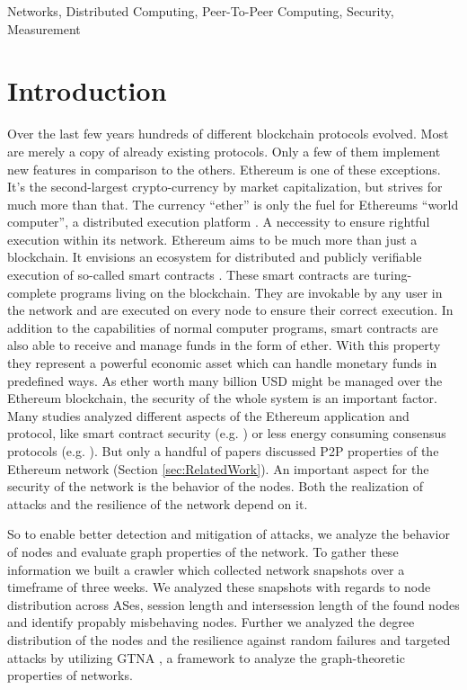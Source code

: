 \documentclass[10pt,conference,final]{IEEEtran}
\begin{document}
\begin{IEEEkeywords}
Networks, Distributed Computing, Peer-To-Peer Computing, Security, Measurement
\end{IEEEkeywords}

\maketitle


\section{Introduction}
Over the last few years hundreds of different blockchain protocols evolved.
Most are merely a copy of already existing protocols.
Only a few of them implement new features in comparison to the others.
Ethereum \cite{1,2} is one of these exceptions.
It's the second-largest crypto-currency by market capitalization, but strives for much more than that.
The currency ``ether'' is only the fuel for Ethereums ``world computer'', a distributed execution platform \cite{3,4}.
A neccessity to ensure rightful execution within its network.
Ethereum aims to be much more than just a blockchain.
It envisions an ecosystem for distributed and publicly verifiable execution of so-called smart contracts \cite{5}.
These smart contracts are turing-complete programs living on the blockchain.
They are invokable by any user in the network and are executed on every node to ensure their correct execution.
In addition to the capabilities of normal computer programs, smart contracts are also able to receive and manage funds in the form of ether.
With this property they represent a powerful economic asset which can handle monetary funds in predefined ways.
As ether worth many billion USD might be managed over the Ethereum blockchain, the security of the whole system is an important factor.
Many studies analyzed different aspects of the Ethereum application and protocol, like smart contract security (e.g. \cite{7,8}) or less energy consuming consensus protocols (e.g. \cite{9,10}).
But only a handful of papers discussed P2P properties of the Ethereum network (Section \ref{sec:RelatedWork}).
An important aspect for the security of the network is the behavior of the nodes.
Both the realization of attacks and the resilience of the network depend on it.

So to enable better detection and mitigation of attacks, we analyze the behavior of nodes and evaluate graph properties of the network.
To gather these information we built a crawler which collected network snapshots over a timeframe of three weeks.
We analyzed these snapshots with regards to node distribution across ASes, session length and intersession length of the found nodes and identify propably misbehaving nodes.
Further we analyzed the degree distribution of the nodes and the resilience against random failures and targeted attacks by utilizing GTNA \cite{11}, a framework to analyze the graph-theoretic properties of networks.
\end{document}
